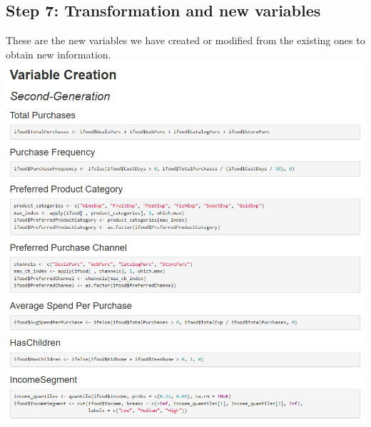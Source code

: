 \documentclass[12pt,a4paper]{article}
\begin{document}
\subsection{Step 7: Transformation and new variables}
These are the new variables we have created or modified from the existing ones to obtain new information.\\
\includegraphics[width=\textwidth]{Imatges/pre4.png}
\end{document}

